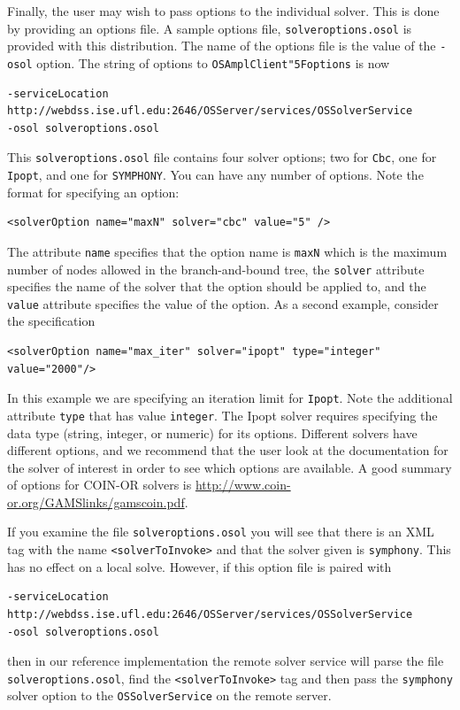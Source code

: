 \documentclass[11pt]{article}
\renewcommand{\_}{{\char"5F}}
\renewcommand{\{}{{\char"7B}}
\renewcommand{\}}{{\char"7D}}
\renewcommand{\^}{{\char"0D}}
\renewcommand{\'}{{\char"0D}}
\begin{document}
\begin{enumerate}[Step 1:]
\medskip

Finally, the user may wish to pass options to the individual solver. This is done by providing an options file.
A sample options file, {\tt solveroptions.osol} is 
provided with this distribution.  The name of the options file is the value of the {\tt -osol} option.
The string of options to {\tt OSAmplClient\_options} is now
\begin{verbatim}
-serviceLocation http://webdss.ise.ufl.edu:2646/OSServer/services/OSSolverService
-osol solveroptions.osol
\end{verbatim}
This   {\tt solveroptions.osol}  file contains four solver options; two for {\tt Cbc}, one for {\tt Ipopt}, 
and one for {\tt SYMPHONY}.
You can have any number of options. Note the format for specifying an option:
\begin{verbatim}
<solverOption name="maxN" solver="cbc" value="5" />
\end{verbatim}
The attribute {\tt name} specifies that the option name is {\tt maxN} which is the maximum number of nodes 
allowed in the branch-and-bound tree, the {\tt solver} attribute specifies the name of the solver that the 
option should be applied to, and the {\tt value} attribute specifies the value of the option. 
As a second example, consider the specification
\begin{verbatim}
<solverOption name="max_iter" solver="ipopt" type="integer" value="2000"/> 
\end{verbatim}
In this example we are specifying an iteration limit for {\tt Ipopt}.  Note the additional attribute 
{\tt type} that has value  {\tt integer}. The Ipopt solver requires specifying the data type 
(string, integer, or numeric) for its options.   Different solvers have different options, 
and we recommend that the user look at the documentation for the solver of interest in order to see 
which options are available.  
A good summary of options for COIN-OR solvers is \url{http://www.coin-or.org/GAMSlinks/gamscoin.pdf}.


If you examine the file {\tt solveroptions.osol} you will see that there is an XML tag  with the name
{\tt <solverToInvoke>} and that the solver given is {\tt symphony}.   
This has no effect on a local solve. However, if this option file is paired with 

\begin{verbatim}
-serviceLocation http://webdss.ise.ufl.edu:2646/OSServer/services/OSSolverService
-osol solveroptions.osol
\end{verbatim}
then in our reference implementation the remote solver service will parse the file {\tt solveroptions.osol}, find the {\tt <solverToInvoke>} tag and then pass the {\tt symphony} solver option to the {\tt OSSolverService} on the remote server.


\end{enumerate}
\end{document}
